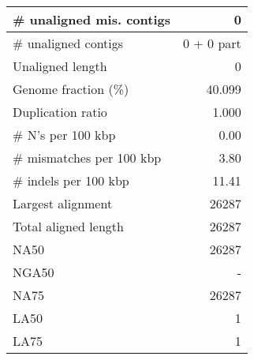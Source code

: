 \documentclass[12pt,a4paper]{article}
\begin{document}
\begin{table}[ht]
\begin{center}
\begin{tabular}{|l*{1}{|r}|}
\# unaligned mis. contigs & 0 \\ \hline
\# unaligned contigs & 0 + 0 part \\ \hline
Unaligned length & 0 \\ \hline
Genome fraction (\%) & 40.099 \\ \hline
Duplication ratio & 1.000 \\ \hline
\# N's per 100 kbp & 0.00 \\ \hline
\# mismatches per 100 kbp & 3.80 \\ \hline
\# indels per 100 kbp & 11.41 \\ \hline
Largest alignment & 26287 \\ \hline
Total aligned length & 26287 \\ \hline
NA50 & 26287 \\ \hline
NGA50 & - \\ \hline
NA75 & 26287 \\ \hline
LA50 & 1 \\ \hline
LA75 & 1 \\ \hline
\end{tabular}
\end{center}
\end{table}
\end{document}
